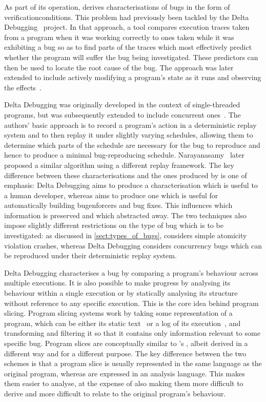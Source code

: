 As part of its operation, {\technique} derives characterisations of
bugs in the form of \glspl{verificationcondition}.  This problem had
previously been tackled by the Delta Debugging~\cite{Cleve2005}
project.  In that approach, a tool compares execution traces taken
from a program when it was working correctly to ones taken while it
was exhibiting a bug so as to find parts of the traces which most
effectively predict whether the program will suffer the bug being
investigated.  These predictors can then be used to locate the root
cause of the bug.  The approach was later extended to include actively
modifying a program's state as it runs and observing the
effects~\cite{Jeffrey2009}.

Delta Debugging was originally developed in the context of
single-threaded programs, but was subsequently extended to include
concurrent ones~\cite{Choi2002}.  The authors' basic approach is to
record a program's action in a deterministic replay system and to then
replay it under slightly varying schedules, allowing them to determine
which parts of the schedule are necessary for the bug to reproduce and
hence to produce a minimal bug-reproducing schedule.
Narayanasamy~\cite{Narayanasamy2007} later proposed a similar
algorithm using a different replay framework.  The key difference
between these characterisations and the ones produced by {\technique}
is one of emphasis: Delta Debugging aims to produce a characterisation
which is useful to a human developer, whereas {\technique} aims to
produce one which is useful for automatically building
\glspl{bugenforcer} and bug fixes.  This influences which information
is preserved and which abstracted away.  The two techniques also
impose slightly different restrictions on the type of bug which is to
be investigated: as discussed in \autoref{sect:types_of_bugs},
{\technique} considers simple atomicity violation crashes, whereas
Delta Debugging considers concurrency bugs which can be reproduced
under their deterministic replay system.

Delta Debugging characterises a bug by comparing a program's behaviour
across multiple executions.  It is also possible to make progress by
analysing its behaviour within a single execution or by statically
analysing its structure without reference to any specific execution.
This is the core idea behind program slicing.  Program slicing systems
work by taking some representation of a program, which can be either
its static text~\cite{Weiser1981} or a log of its
execution~\cite{Agrawal1990a}, and transforming and filtering it so
that it contains only information relevant to some specific bug.
Program slices are conceptually similar to {\technique}'s
{\StateMachines}, albeit derived in a different way and for a
different purpose.  The key difference between the two schemes is that
a program slice is usually represented in the same language as the
original program, whereas {\StateMachines} are expressed in an
analysis language.  This makes them easier to analyse, at the expense
of also making them more difficult to derive and more difficult to
relate to the original program's behaviour.


